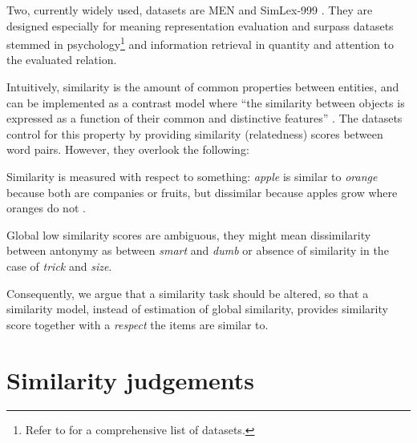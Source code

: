 \documentclass[11pt]{article}
\begin{document}
Two, currently widely used, datasets are MEN \cite{Bruni:2012:DST:2390524.2390544} and SimLex-999 \cite{hill2014simlex}. They are designed especially for meaning representation evaluation and surpass datasets stemmed in psychology\footnote{Refer to  for a comprehensive list of datasets.} and information retrieval \cite{2002:PSC:503104.503110} in quantity and attention to the evaluated relation.

Intuitively, similarity is the amount of common properties between entities, and can be implemented as a contrast model where ``the similarity between objects is expressed as a function of their common and distinctive features'' \cite{Tversky1977}. The datasets control for this property by providing similarity (relatedness) scores between word pairs. However, they overlook the following:
\begin{compactitem}
    \item Similarity is measured with respect to something: \textit{apple} is similar to \textit{orange} because both are companies or fruits, but dissimilar because apples grow where oranges do not \cite{hahn1997concepts}.
    \item Global low similarity scores are ambiguous, they might mean dissimilarity between antonymy as between \textit{smart} and \textit{dumb} or absence of similarity in the case of \textit{trick} and \textit{size}.
\end{compactitem}
%
Consequently, we argue that a similarity task should be altered, so that a similarity model, instead of estimation of global similarity, provides similarity score together with a \emph{respect} the items are similar to.


\section{Similarity judgements}
\end{document}
